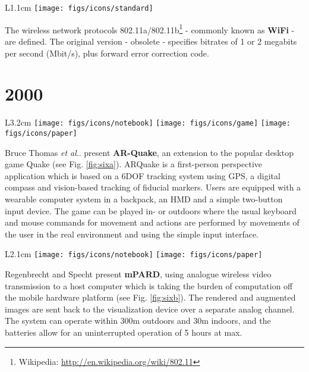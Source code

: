 \documentclass[12pt,a4paper]{article}
\makeatletter
\DeclareRobustCommand\onedot{\futurelet\@let@token\@onedot}
\def\@onedot{\ifx\@let@token.\else.\null\fi\xspace}
\def\etal{\emph{et al}\onedot}
\makeatother
\begin{document}
\vspace{0.1in}

\begin{wrapfigure}{L}{1.1cm}
	\vspace{-10pt}	
	\texttt{[image: figs/icons/standard]}
	\vspace{-0pt}		
\end{wrapfigure}
\noindent The wireless network protocols 802.11a/802.11b\footnote{Wikipedia: \url{http://en.wikipedia.org/wiki/802.11}} - commonly known as \textbf{WiFi} - are defined. The original version - obsolete - specifies bitrates of 1 or 2 megabits per second (Mbit/s), plus forward error correction code.
 
\vspace{-5pt}
\section*{2000}

\begin{wrapfigure}{L}{3.2cm}
	\vspace{-10pt}	
	\texttt{[image: figs/icons/notebook]}
	\texttt{[image: figs/icons/game]}
	\texttt{[image: figs/icons/paper]}		
	\vspace{-20pt}		
\end{wrapfigure}
Bruce Thomas \etal present \textbf{AR-Quake}, an extension to the popular desktop game Quake \cite{Thomas00} (see Fig. \ref{fig:sixa}). ARQuake is a first-person perspective application which is based on a 6DOF tracking system using GPS, a digital compass and vision-based tracking of fiducial markers. Users are equipped with a wearable computer system in a backpack, an HMD and a simple two-button input device. The game can be played in- or outdoors where the usual keyboard and mouse commands for movement and actions are performed by movements of the user in the real environment and using the simple input interface.

\vspace{0.1in}

\begin{wrapfigure}{L}{2.1cm}
	\vspace{0pt}	
	\texttt{[image: figs/icons/notebook]}
	\texttt{[image: figs/icons/paper]}	
	\vspace{-20pt}		
\end{wrapfigure}
\noindent
Regenbrecht and Specht present \textbf{mPARD}, using analogue wireless video transmission to a host computer which is taking the burden of computation off the mobile hardware platform \cite{Regenbrecht00} (see Fig. \ref{fig:sixb}). The rendered and augmented images are sent back to the visualization device over a separate analog channel. The system can operate within 300m outdoors and 30m indoors, and the batteries allow for an uninterrupted operation of 5 hours at max.
\end{document}
